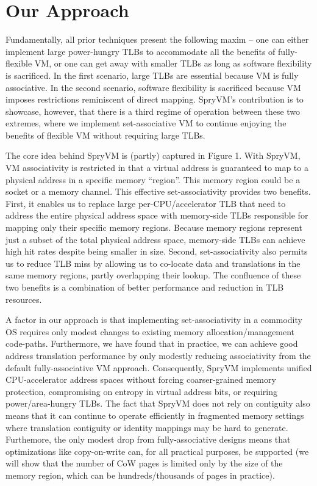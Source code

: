 \section{Our Approach}\label{our-approach}
Fundamentally, all prior techniques present the following maxim -- one
can either implement large power-hungry TLBs to accommodate all the
benefits of fully-flexible VM, or one can get away with smaller TLBs
as long as software flexibility is sacrificed. In the first scenario,
large TLBs are essential because VM is fully associative. In the
second scenario, software flexibility is sacrificed because VM imposes
restrictions reminiscent of direct mapping. SpryVM's contribution is
to showcase, however, that there is a third regime of operation
between these two extremes, where we implement set-associative VM to
continue enjoying the benefits of flexible VM without requiring large
TLBs. 

The core idea behind SpryVM is (partly) captured in Figure 1. With
SpryVM, VM associativity is restricted in that a virtual address is
guaranteed to map to a physical address in a specific memory
``region''. This memory region could be a socket or a memory
channel. This effective set-associativity provides two
benefits. First, it enables us to replace large per-CPU/accelerator
TLB that need to address the entire physical address space with
memory-side TLBs responsible for mapping only their specific memory
regions. Because memory regions represent just a subset of the total
physical address space, memory-side TLBs can achieve high hit rates
despite being smaller in size. Second, set-associativity also permits
us to reduce TLB miss by allowing us to co-locate data and
translations in the same memory regions, partly overlapping their
lookup. The confluence of these two benefits is a combination of
better performance and reduction in TLB resources. 

A factor in our approach is that implementing set-associativity in a
commodity OS requires only modest changes to existing memory
allocation/management code-paths. Furthermore, we have found that in
practice, we can achieve good address translation performance by only
modestly reducing associativity from the default fully-associative VM
approach. Consequently, SpryVM implements unified CPU-accelerator
address spaces without forcing coarser-grained memory protection,
compromising on entropy in virtual address bits, or requiring
power/area-hungry TLBs. The fact that SpryVM does not rely on
contiguity also means that it can continue to operate efficiently in
fragmented memory settings where translation contiguity or identity
mappings may be hard to generate. Furthemore, the only modest drop
from fully-associative designs means that optimizations like
copy-on-write can, for all practical purposes, be supported (we will
show that the number of CoW pages is limited only by the size of the
memory region, which can be hundreds/thousands of pages in practice).


